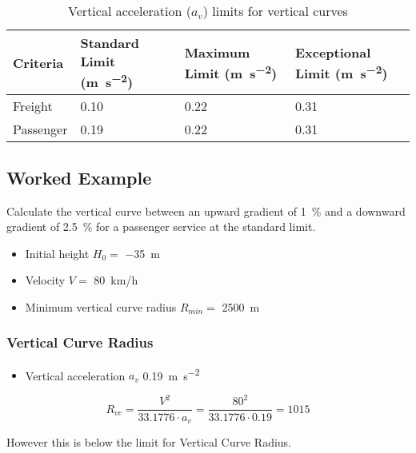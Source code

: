 \documentclass{bcrre_exam}
\begin{document}
\begin{table}[h]
\centering
\caption{Vertical acceleration ($a_v$) limits for vertical curves}
\label{tab:vert-acc-limits}
\begin{tabular}{@{}llll@{}}
\toprule
Criteria  & Standard Limit (\unit{\meter \per \second \squared}) & Maximum Limit (\unit{\meter \per \second \squared}) & Exceptional Limit (\unit{\meter \per \second \squared}) \\ \midrule
Freight   & 0.10                                     & 0.22                                  & 0.31                                      \\
Passenger & 0.19                                    & 0.22                                  & 0.31                                      \\ \bottomrule
\end{tabular}
\end{table}

\subsection*{Worked Example}
Calculate the vertical curve between an upward gradient of \qty{1}{\percent} and a downward gradient of \qty{2.5}{\percent} for a passenger service at the standard limit.

\begin{itemize}
    \item Initial height $H_0=$ \qty{-35}{\meter}
    \item Velocity $V=$ \qty{80}{km/h}
    \item Minimum vertical curve radius $R_{min}=$ \qty{2500}{m}
\end{itemize}

\subsubsection*{Vertical Curve Radius}

\begin{itemize}
    \item Vertical acceleration $a_v$ \qty{0.19}{\meter \per \second \squared}
\end{itemize}

\begin{equation}
    R_{vc}=\frac{V^2}{33.1776 \cdot a_v}=\frac{80^2}{33.1776 \cdot 0.19} = 1015
\end{equation}

However this is below the limit for Vertical Curve Radius.
\end{document}
